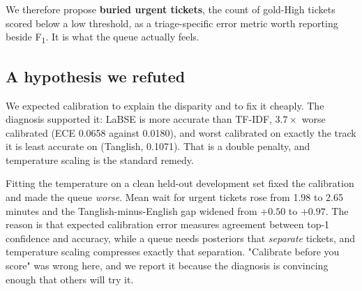 We therefore propose \textbf{buried urgent tickets}, the count of gold-High
tickets scored below a low threshold, as a triage-specific error metric worth
reporting beside F\textsubscript{1}. It is what the queue actually feels.

\subsection{A hypothesis we refuted}

We expected calibration to explain the disparity and to fix it cheaply. The
diagnosis supported it: LaBSE is more accurate than TF-IDF, $3.7\times$ worse
calibrated (ECE 0.0658 against 0.0180), and worst calibrated on exactly the track
it is least accurate on (Tanglish, 0.1071). That is a double penalty, and
temperature scaling \cite{guo2017calibration} is the standard remedy.

Fitting the temperature on a clean held-out development set fixed the
calibration and made the queue \emph{worse}. Mean wait for urgent tickets rose
from 1.98 to 2.65 minutes and the Tanglish-minus-English gap widened from $+0.50$
to $+0.97$. The reason is that expected calibration error measures agreement
between top-1 confidence and accuracy, while a queue needs posteriors that
\emph{separate} tickets, and temperature scaling compresses exactly that
separation. "Calibrate before you score" was wrong here, and we report it because
the diagnosis is convincing enough that others will try it.

